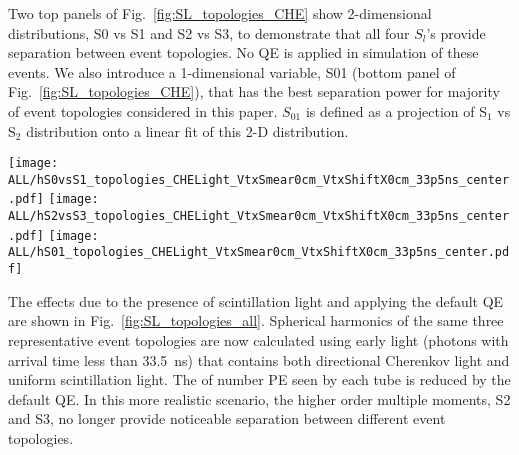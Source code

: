 Two top panels of Fig.~\ref{fig:SL_topologies_CHE} show 2-dimensional distributions, S0 vs S1 and S2 vs S3, to demonstrate that all four $S_l$'s provide separation between event topologies. No QE is applied in simulation of these events. We also introduce a 1-dimensional variable, S01 (bottom panel of Fig.~\ref{fig:SL_topologies_CHE}), that has the best separation power for majority of event topologies considered in this paper. $S_{01}$ is defined as a projection of S$_1$ vs S$_2$ distribution onto a linear fit of this 2-D distribution.


\begin{figure*}[h]
  \centering
  \texttt{[image: ALL/hS0vsS1\_topologies\_CHELight\_VtxSmear0cm\_VtxShiftX0cm\_33p5ns\_center.pdf]}
  \texttt{[image: ALL/hS2vsS3\_topologies\_CHELight\_VtxSmear0cm\_VtxShiftX0cm\_33p5ns\_center.pdf]}
  \texttt{[image: ALL/hS01\_topologies\_CHELight\_VtxSmear0cm\_VtxShiftX0cm\_33p5ns\_center.pdf]}
  \caption{Spherical harmonics for three event topologies: two
    back-to-back 1.26~MeV electrons (\emph{black squares and black
      dotted line}), two 1.26~MeV electrons at 90$^{\circ}$ angle
    (\emph{blue triangles and blue dashed line}), and a single
    2.529~MeV electron representing $^{8}$B background (\emph{red
      crosses and red solid line}). Simulation of 1000 events
    originated at the center of the sphere. Perfect separation between
    Cherenkov and scintillation light is implemented in this
    simulation by using only Cherenkov photons. \emph{Top left:} $S_0$
    versus $S_1$ scatter plot. Black dotted line is a linear fit of
    the 90$^{\circ}$ topology and $^{8}$B events. Variable $S_{01}$ is
    defined as a projection of 2D distribution onto this linear
    fit. \emph{Top right:} $S_2$ versus $S_3$ scatter
    plot. \emph{Bottom:} $S_{01}$ distributions for the three
    topologies. These distributions are normalized to unit area for
    shape comparison.}
  \label{fig:SL_topologies_CHE}
\end{figure*}


The effects due to the presence of scintillation light and applying the default QE are shown in Fig.~\ref{fig:SL_topologies_all}. Spherical harmonics of the same three representative event topologies are now calculated using early light (photons with arrival time less than 33.5~ns) that contains both directional Cherenkov light and uniform scintillation light. The of number PE seen by each tube is reduced by the default QE. In this more realistic scenario, the higher order multiple moments, S2 and S3, no longer provide noticeable separation between different event topologies.



